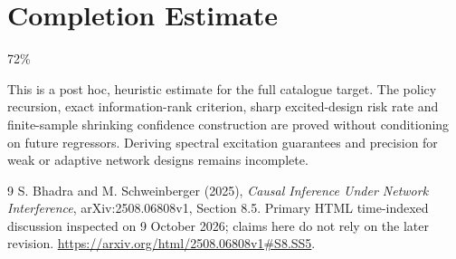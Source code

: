 \documentclass[11pt]{article}
\begin{document}
\section{Completion Estimate}
72\%

This is a post hoc, heuristic estimate for the full catalogue target.
The policy recursion, exact information-rank criterion, sharp excited-design risk rate and finite-sample shrinking confidence construction are proved without conditioning on future regressors. Deriving spectral excitation guarantees and precision for weak or adaptive network designs remains incomplete.

\begin{thebibliography}{9}
 S. Bhadra and M. Schweinberger (2025), \emph{Causal Inference Under Network Interference}, arXiv:2508.06808v1, Section 8.5. Primary HTML time-indexed discussion inspected on 9 October 2026; claims here do not rely on the later revision. \url{https://arxiv.org/html/2508.06808v1#S8.SS5}.
\end{thebibliography}
\end{document}
